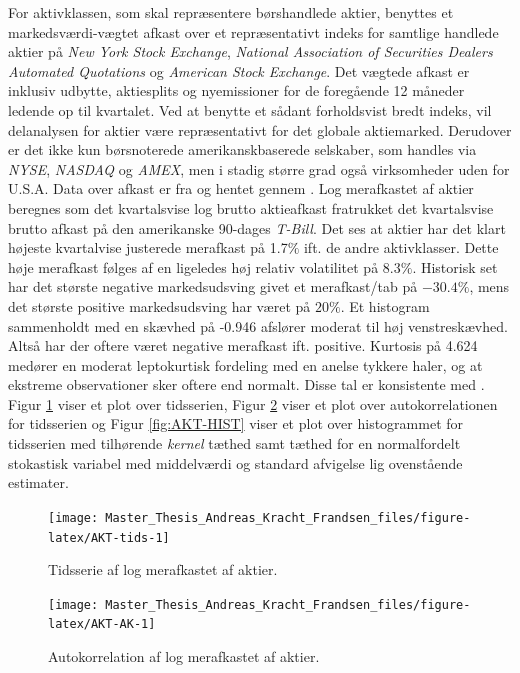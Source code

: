 \documentclass[
  a4paper,
  oneside]{memoir}
\begin{document}
For aktivklassen, som skal repræsentere børshandlede aktier, benyttes et markedsværdi-vægtet afkast over et repræsentativt indeks for samtlige handlede aktier på \emph{New York Stock Exchange}, \emph{National Association of Securities Dealers Automated Quotations} og \emph{American Stock Exchange}. Det vægtede afkast er inklusiv udbytte, aktiesplits og nyemissioner for de foregående 12 måneder ledende op til kvartalet. Ved at benytte et sådant forholdsvist bredt indeks, vil delanalysen for aktier være repræsentativt for det globale aktiemarked. Derudover er det ikke kun børsnoterede amerikanskbaserede selskaber, som handles via \emph{NYSE}, \emph{NASDAQ} og \emph{AMEX}, men i stadig større grad også virksomheder uden for U.S.A. Data over afkast er fra \citep{CRSPakt} og hentet gennem \citep{WRDSakt}. Log merafkastet af aktier beregnes som det kvartalsvise log brutto aktieafkast fratrukket det kvartalsvise brutto afkast på den amerikanske 90-dages \emph{T-Bill}. Det ses at aktier har det klart højeste kvartalvise justerede merafkast på 1.7\(\%\) ift. de andre aktivklasser. Dette høje merafkast følges af en ligeledes høj relativ volatilitet på 8.3\(\%\). Historisk set har det største negative markedsudsving givet et merafkast/tab på \(-30.4\%\), mens det største positive markedsudsving har været på \(20\%\). Et histogram sammenholdt med en skævhed på -0.946 afslører moderat til høj venstreskævhed. Altså har der oftere været negative merafkast ift. positive. Kurtosis på 4.624 medører en moderat leptokurtisk fordeling med en anelse tykkere haler, og at ekstreme observationer sker oftere end normalt. Disse tal er konsistente med \citep{CampVic2003}. Figur \ref{fig:AKT-tids} viser et plot over tidsserien, Figur \ref{fig:AKT-AK} viser et plot over autokorrelationen for tidsserien og Figur \ref{fig:AKT-HIST} viser et plot over histogrammet for tidsserien med tilhørende \emph{kernel} tæthed samt tæthed for en normalfordelt stokastisk variabel med middelværdi og standard afvigelse lig ovenstående estimater.

\begin{figure}[htbp!]

{\centering \texttt{[image: Master\_Thesis\_Andreas\_Kracht\_Frandsen\_files/figure-latex/AKT-tids-1]} 

}

\caption{Tidsserie af log merafkastet af aktier.}\label{fig:AKT-tids}
\end{figure}

\begin{figure}[htbp!]

{\centering \texttt{[image: Master\_Thesis\_Andreas\_Kracht\_Frandsen\_files/figure-latex/AKT-AK-1]} 

}

\caption{Autokorrelation af log merafkastet af aktier.}\label{fig:AKT-AK}
\end{figure}
\end{document}

